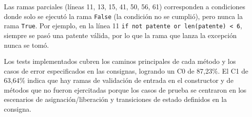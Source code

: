Las ramas parciales (líneas 11, 13, 15, 41, 50, 56, 61) corresponden a condiciones donde solo se ejecutó la rama \texttt{False} (la condición no se cumplió), pero nunca la rama \texttt{True}. Por ejemplo, en la línea 11 \texttt{if not patente or len(patente) < 6}, siempre se pasó una patente válida, por lo que la rama que lanza la excepción nunca se tomó.


Los tests implementados cubren los caminos principales de cada método y los casos de error especificados en las consignas, logrando un C0 de 87,23\%. El C1 de 63,64\% indica que hay ramas de validación de entrada en el constructor y de métodos que no fueron ejercitadas porque los casos de prueba se centraron en los escenarios de asignación/liberación y transiciones de estado definidos en la consigna.
